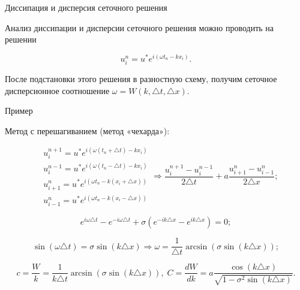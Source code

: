 \documentclass[10pt,xcolor=pst,aspectratio=169]{beamer}
\begin{document}
\begin{frame}{Диссипация и дисперсия сеточного решения}

    \transdissolve[duration=0.1]
    \justifying
    \large

    Анализ диссипации и дисперсии сеточного решения можно проводить на решении

    \[
        u^{n}_{i} = u^{*} e^{i \left( \omega t_{n} - k x_{i} \right)}.
    \]
    
    После подстановки этого решения в разностную схему, получим сеточное дисперсионное соотношение $\omega = W \left( k, \triangle t, \triangle x \right)$.

\end{frame}

\begin{frame}{Пример}

    \transdissolve[duration=0.1]
    \justifying
    \large

    Метод с перешагиванием (метод «чехарда»):

    \[
        \boxed{
        \begin{split}
            &u^{n + 1}_{i} = u^{*} e^{i \left( \omega \left( t_{n} + \triangle t \right) - k x_{i} \right)}\\
            &u^{n - 1}_{i} = u^{*} e^{i \left( \omega \left( t_{n} - \triangle t \right) - k x_{i} \right)}\\
            &u^{n}_{i + 1} = u^{*} e^{i \left( \omega t_{n} - k \left( x_{i} + \triangle x \right) \right)}\\
            &u^{n}_{i - 1} = u^{*} e^{i \left( \omega t_{n} - k \left( x_{i} - \triangle x \right) \right)}
        \end{split}
        }
        \Rightarrow
        \frac{u^{n + 1}_{i} - u^{n - 1}_{i}}{2 \triangle t} + a \frac{u^{n}_{i + 1} - u^{n}_{i - 1}}{2 \triangle x};
    \]

    \[
        e^{i \omega \triangle t} - e^{- i \omega \triangle t} + \sigma \left( e^{- i k \triangle x} - e^{i k \triangle x} \right)= 0;
    \]

    \[
        \sin{\left( \omega \triangle t \right)} = \sigma \sin{\left( k \triangle x \right)}
        \Rightarrow
        \omega = \frac{1}{\triangle t} \arcsin{\left( \sigma \sin{\left( k \triangle x \right)} \right)};
    \]

    \[
        c = \frac{W}{k} = \frac{1}{k \triangle t} \arcsin{\left( \sigma \sin{\left( k \triangle x \right)} \right)}, \;
        C = \frac{d W}{d k} = a \frac{\cos{\left( k \triangle x \right)}}{\sqrt{1 - \sigma^{2} \sin{\left( k \triangle x \right)}}}.
    \]

\end{frame}
\end{document}
